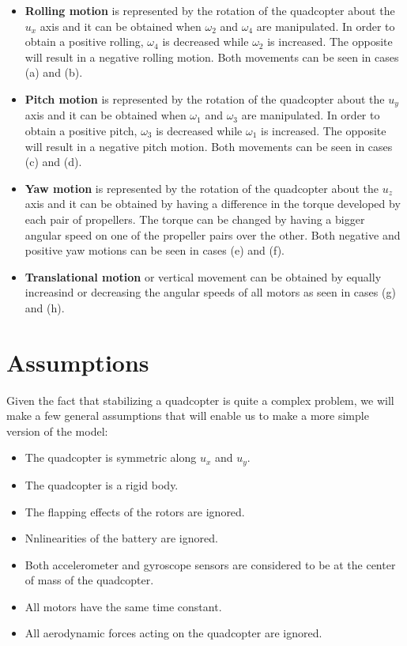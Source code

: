 \begin{itemize}
  \item \textbf{Rolling motion }is represented by the rotation of the quadcopter about the $u_{x}$ axis and it can be obtained when $\omega_{2}$ and $\omega_{4}$ are manipulated. In order to obtain a positive rolling, $\omega_{4}$ is decreased while $\omega_{2}$ is increased. The opposite will result in a negative rolling motion. Both movements can be seen in cases (a) and (b).
  \item \textbf{Pitch motion} is represented by the rotation of the quadcopter about the $u_{y}$ axis and it can be obtained when $\omega_{1}$ and $\omega_{3}$ are manipulated. In order to obtain a positive pitch, $\omega_{3}$ is decreased while $\omega_{1}$ is increased. The opposite will result in a negative pitch motion. Both movements can be seen in cases (c) and (d).
  \item \textbf{Yaw motion} is represented by the rotation of the quadcopter about the $u_{z}$ axis and it can be obtained by having a difference in the torque developed by each pair of propellers. The torque can be changed by having a bigger angular speed on one of the propeller pairs over the other. Both negative and positive yaw motions can be seen in cases (e) and (f).
  \item \textbf{Translational motion} or vertical movement can be obtained by equally increasind or decreasing the angular speeds of all motors as seen in cases (g) and (h).
\end{itemize} 


\section{Assumptions}
Given the fact that stabilizing a quadcopter is quite a complex problem, we will make a few general assumptions that will enable us to make a more simple version of the model:
\begin{itemize}
  \item The quadcopter is symmetric along $u_{x}$ and $u_{y}$.
  \item The quadcopter is a rigid body.
  \item The flapping effects of the rotors are ignored.
  \item Nnlinearities of the battery are ignored.
  \item Both accelerometer and gyroscope sensors are considered to be at the center of mass of the quadcopter.
  \item All motors have the same time constant.
  \item All aerodynamic forces acting on the quadcopter are ignored.
\end{itemize} 

